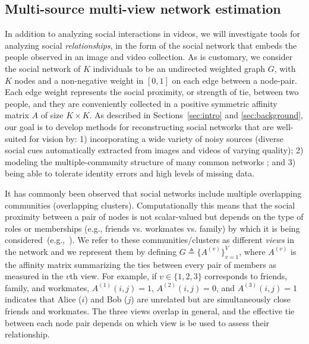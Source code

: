 
\subsection{Multi-source multi-view network estimation}
\label{sec:vis2net}

In addition to analyzing social interactions in videos, we will investigate tools for analyzing social \emph{relationships}, in the form of the social network that embeds the people observed in an image and video collection. As is customary, we consider the social network of $K$ individuals to be an undirected weighted graph $G$, with $K$ nodes and a non-negative weight in $[0,1]$ on each edge between a node-pair. Each edge weight represents the social proximity, or strength of tie, between two people, and they are conveniently collected in a positive symmetric affinity matrix $A$ of size $K\times K$. As described in Sections~\ref{sec:intro} and \ref{sec:background}, our goal is to develop methods for reconstructing social networks that are well-suited for vision by: 1) incorporating a wide variety of noisy sources (diverse social cues automatically extracted from images and videos of varying quality); 2) modeling the multiple-community structure of many common networks ; and 3) being able to tolerate identity errors and high levels of missing data.

It has commonly been observed that social networks include multiple overlapping communities (overlapping clusters). Computationally this means that the social proximity between a pair of nodes is not scalar-valued but depends on the type of roles or memberships (e.g., friends vs. workmates vs. family) by which it is being considered~(e.g.,~\cite{AiroldiBFX08,Kim12}). We refer to these communities/clusters as different \emph{views} in the network and we represent them by defining $G\triangleq\{A^{(v)}\}_{v=1}^{V}$, where $A^{(v)}$ is the affinity matrix summarizing the ties between every pair of members as measured in the $v$th view. For example, if $v\in\{1,2,3\}$ corresponds to friends, family, and workmates,  $A^{(1)}(i,j)=1$, $A^{(2)}(i,j)=0$, and $A^{(3)}(i,j)=1$ indicates that Alice ($i$) and Bob ($j$) are unrelated but are simultaneously close friends and workmates. The three views overlap in general, and the effective tie between each node pair depends on which view is be used to assess their relationship.

